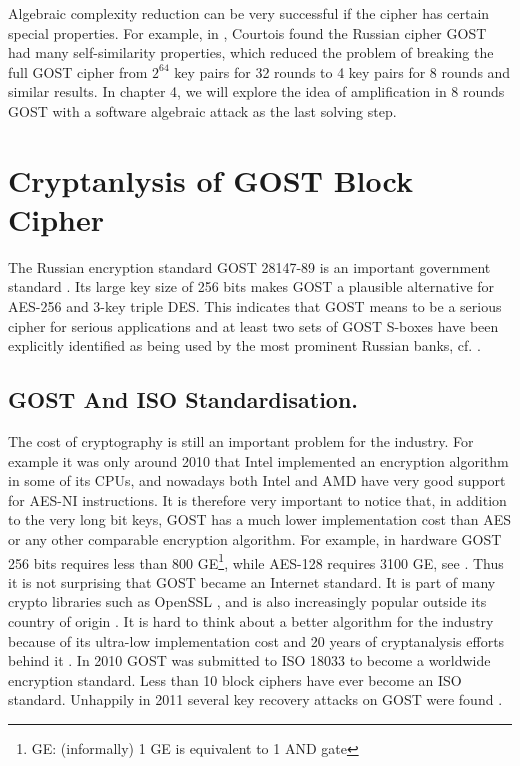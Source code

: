 Algebraic complexity reduction can be very successful if the cipher has certain special properties. For example, in \cite{gostac}, Courtois found the Russian cipher GOST had many self-similarity properties, which reduced the problem of breaking the full GOST cipher from $2^{64}$ key pairs for 32 rounds to 4 key pairs for 8 rounds and similar results. In chapter 4, we will explore the idea of amplification in 8 rounds GOST with a software algebraic attack as the last solving step.


\section{Cryptanlysis of GOST Block Cipher} \label{sec:introductionToGOST}
The Russian encryption standard
GOST 28147-89 %
is an important government standard
\cite{gost198928147}.
Its large key size of 256 bits makes GOST a plausible alternative for AES-256 and 3-key triple DES.
This indicates that GOST means to be a serious cipher for serious applications
and at least two sets of GOST S-boxes have been explicitly identified as being used by the most prominent Russian banks, %
cf. \cite{schneier2007applied,GOSTRussianReferenceImplementation}.

\subsection{GOST And ISO Standardisation.}
The cost of cryptography is still an important problem for the industry.
For example it was only around 2010 that Intel implemented an encryption algorithm
in some of its CPUs, and nowadays both Intel and AMD have very good support for AES-NI instructions.
It is therefore very important to notice that,
in addition to the very long bit keys,
GOST has a much lower implementation cost
than AES or any other comparable encryption algorithm.
For example, in hardware GOST 256 bits requires less than 800 GE\footnote{GE: (informally) 1 GE is equivalent to 1 AND gate },
while AES-128 requires 3100 GE, see \cite{PoschmannImplement}.
Thus it is not surprising that GOST became an Internet standard.
It is part of many crypto libraries such as OpenSSL
\cite{GOSTRussianReferenceImplementation}, %
and is also increasingly popular %
outside its country of origin
\cite{PoschmannImplement}.
It is hard to think about a better algorithm for the industry
because of its ultra-low implementation cost and
20 years of cryptanalysis efforts behind it \cite{PoschmannImplement}.
In 2010 GOST was submitted to ISO 18033
to become a worldwide encryption standard.
Less than 10
block ciphers have ever become an
ISO %
standard.
Unhappily in 2011 several key recovery attacks on GOST were found
\cite{JapaneseGOSTMITMFSE2011,gostreport,gostac,gostdc0,gostdc2}.

